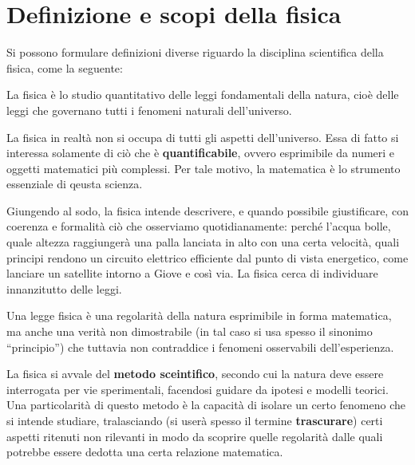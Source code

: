 \marginpar{\minitoc}

\section{Definizione e scopi della fisica}

Si possono formulare definizioni diverse riguardo la disciplina scientifica
della fisica, come la seguente:

\begin{tcolorbox}[colback = yellow!30, colframe = yellow!30!black, title = {Fisica}]
La fisica è lo studio quantitativo delle leggi fondamentali della natura, cioè
delle leggi che governano tutti i fenomeni naturali dell'universo.
\end{tcolorbox}

\noindent La fisica in realtà non si occupa di tutti gli aspetti dell'universo.
Essa di fatto si interessa solamente di ciò che è \textbf{quantificabile}, ovvero
esprimibile da numeri e oggetti matematici più complessi. Per tale motivo,
la matematica è lo strumento essenziale di qeusta scienza.

Giungendo al sodo, la fisica intende descrivere, e quando possibile giustificare,
con coerenza e formalità ciò che osserviamo quotidianamente: perché l'acqua
bolle, quale altezza raggiungerà una palla lanciata in alto con una certa
velocità, quali principi rendono un circuito elettrico efficiente dal punto
di vista energetico, come lanciare un satellite intorno a Giove e così via. La
fisica cerca di individuare innanzitutto delle leggi.

\begin{tcolorbox}[colback = yellow!30, colframe = yellow!30!black, title = {Legge}]
    Una legge fisica è una regolarità della natura esprimibile in forma
    matematica, ma anche una verità non dimostrabile (in tal caso si usa spesso il
    sinonimo ``principio'') che tuttavia non contraddice i
    fenomeni osservabili dell'esperienza.
\end{tcolorbox}

\noindent La fisica si avvale del \textbf{metodo sceintifico}, secondo cui la natura deve
essere interrogata per vie sperimentali, facendosi guidare da ipotesi e
modelli teorici. Una particolarità di questo metodo è la capacità di isolare
un certo fenomeno che si intende studiare, tralasciando (si userà spesso il
termine \textbf{trascurare}) certi aspetti ritenuti non rilevanti in modo da
scoprire quelle regolarità dalle quali potrebbe essere dedotta una certa
relazione matematica.

